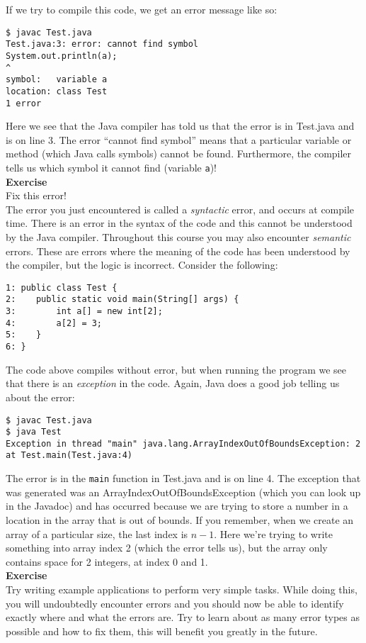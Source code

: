 \noindent
If we try to compile this code, we get an error message like so:

\begin{verbatim}
$ javac Test.java
Test.java:3: error: cannot find symbol
System.out.println(a);
^
symbol:   variable a
location: class Test
1 error
\end{verbatim}

\noindent
Here we see that the Java compiler has told us that the error is in Test.java and is on line 3. The error ``cannot find symbol'' means that a particular variable or method (which Java calls symbols) cannot be found. Furthermore, the compiler tells us which symbol it cannot find (variable {\tt a})!\\

\noindent
{\bf Exercise}\\

\noindent
Fix this error!\\

\noindent
The error you just encountered is called a \emph{syntactic} error, and occurs at compile time. There is an error in the syntax of the code and this cannot be understood by the Java compiler. Throughout this course you may also encounter \emph{semantic} errors. These are errors where the meaning of the code has been understood by the compiler, but the logic is incorrect. Consider the following:

\begin{verbatim}
1: public class Test {
2:    public static void main(String[] args) {
3:        int a[] = new int[2];
4:        a[2] = 3;
5:    }
6: }
\end{verbatim}

\noindent
The code above compiles without error, but when running the program we see that there is an \emph{exception} in the code. Again, Java does a good job telling us about the error:

\begin{verbatim}
$ javac Test.java
$ java Test
Exception in thread "main" java.lang.ArrayIndexOutOfBoundsException: 2
at Test.main(Test.java:4)
\end{verbatim}

\noindent
The error is in the {\tt main} function in Test.java and is on line 4. The exception that was generated was an ArrayIndexOutOfBoundsException (which you can look up in the Javadoc) and has occurred because we are trying to store a number in a location in the array that is out of bounds. If you remember, when we create an array of a particular size, the last index is $n-1$. Here we're trying to write something into array index 2 (which the error tells us), but the array only contains space for 2 integers, at index 0 and 1.\\

\noindent
{\bf Exercise}\\

\noindent
Try writing example applications to perform very simple tasks. While doing this, you will undoubtedly encounter errors and you should now be able to identify exactly where and what the errors are. Try to learn about as many error types as possible and how to fix them, this will benefit you greatly in the future.



